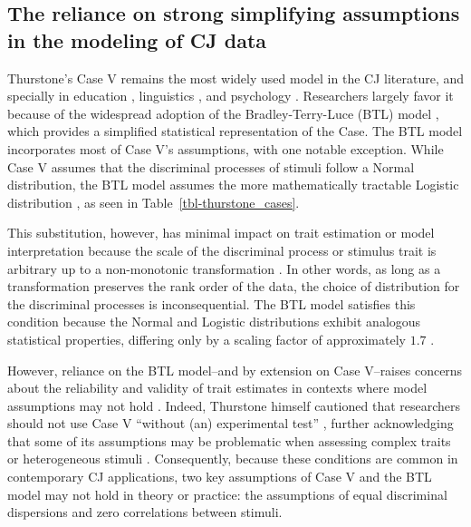 \documentclass[
  authoryear,
  review,
  1p]{elsarticle}
\begin{document}
\subsection{The reliance on strong simplifying assumptions in the
modeling of CJ data}\label{sec-theory-issue1}

Thurstone's Case V remains the most widely used model in the CJ
literature, and specially in education
\citep{Kimbell_2012, Jones_et_al_2015, vanDaal_et_al_2016, Bartholomew_et_al_2018},
linguistics \citep{Boonen_et_al_2020}, and psychology
\citep{Maydeu-Olivares_et_al_2005}. Researchers largely favor it because
of the widespread adoption of the Bradley-Terry-Luce (BTL) model
\citep{Bradley_et_al_1952, Luce_1959}, which provides a simplified
statistical representation of the Case. The BTL model incorporates most
of Case V's assumptions, with one notable exception. While Case V
assumes that the discriminal processes of stimuli follow a Normal
distribution, the BTL model assumes the more mathematically tractable
Logistic distribution \citep{Andrich_1978, Bramley_2008}, as seen in
Table~\ref{tbl-thurstone_cases}.

This substitution, however, has minimal impact on trait estimation or
model interpretation because the scale of the discriminal process or
stimulus trait is arbitrary up to a non-monotonic transformation
\citep{vanderLinden_et_al_2017_I, McElreath_2021}. In other words, as
long as a transformation preserves the rank order of the data, the
choice of distribution for the discriminal processes is inconsequential.
The BTL model satisfies this condition because the Normal and Logistic
distributions exhibit analogous statistical properties, differing only
by a scaling factor of approximately \(1.7\)
\citep{vanderLinden_et_al_2017_I}.

However, reliance on the BTL model--and by extension on Case V--raises
concerns about the reliability and validity of trait estimates in
contexts where model assumptions may not hold
\citep{Kelly_et_al_2022, Andrich_1978}. Indeed, Thurstone himself
cautioned that researchers should not use Case V ``without (an)
experimental test'' \citep[p.~270]{Thurstone_1927b}, further
acknowledging that some of its assumptions may be problematic when
assessing complex traits or heterogeneous stimuli
\citep{Thurstone_1927a}. Consequently, because these conditions are
common in contemporary CJ applications, two key assumptions of Case V
and the BTL model may not hold in theory or practice: the assumptions of
equal discriminal dispersions and zero correlations between stimuli.
\end{document}
